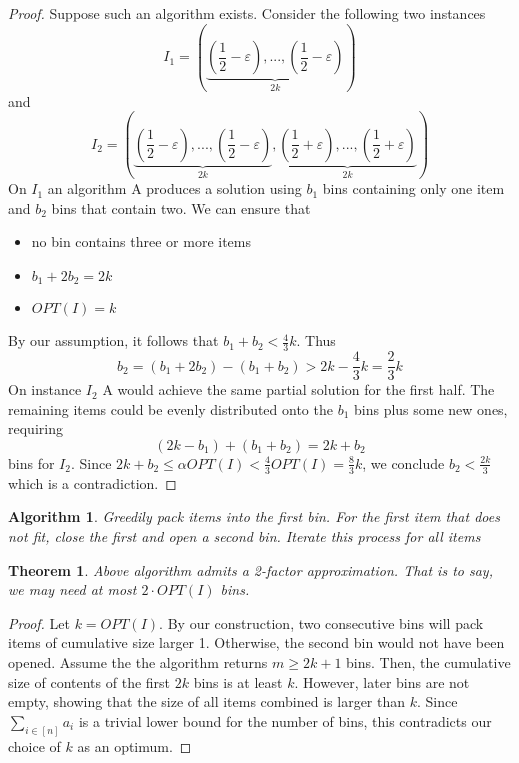 \documentclass[a4paper, 12pt]{article}
\newtheorem{theorem}{Theorem}[section]
\newtheorem{alg}{Algorithm}[section]
\begin{document}
	\begin{proof}
		Suppose such an algorithm exists. Consider the following two instances \[I_1 = \left(\underbrace{\left(\frac{1}{2} - \varepsilon\right), ..., \left(\frac{1}{2}- \varepsilon\right)}_{2k}\right)\] and \[I_2 = \left(\underbrace{\left(\frac{1}{2}- \varepsilon\right), ..., \left(\frac{1}{2}- \varepsilon\right)}_{2k}, \underbrace{\left(\frac{1}{2}+ \varepsilon\right),...,\left(\frac{1}{2}+ \varepsilon\right)}_{2k}\right)\]
		On $I_1$ an algorithm A produces a solution using $b_1$ bins containing only one item and $b_2$ bins that contain two. We can ensure that \begin{itemize}
			\item no bin contains three or more items
			\item $b_1 + 2b_2 = 2k$
			\item $OPT(I) = k$
		\end{itemize}
		By our assumption, it follows that $b_1+b_2 < \frac{4}{3}k$. Thus \[b_2 = (b_1+2b_2) - (b_1+b_2) > 2k - \frac{4}{3}k = \frac{2}{3}k\]
		On instance $I_2$ A would achieve the same partial solution for the first half. The remaining items could be evenly distributed onto the $b_1$ bins plus some new ones, requiring \[(2k-b_1) + (b_1+b_2) = 2k + b_2\]
		bins for $I_2$. Since $2k + b_2 \leq \alpha OPT(I) < \frac{4}{3} OPT(I) = \frac{8}{3}k$, we conclude $b_2 < \frac{2k}{3}$ which is a contradiction.
	\end{proof}
	\begin{alg}
		Greedily pack items into the first bin. For the first item that does not fit, close the first and open a second bin. Iterate this process for all items
	\end{alg}
	\begin{theorem}
		Above algorithm admits a 2-factor approximation. That is to say, we may need at most $2\cdot OPT(I)$ bins.
	\end{theorem}
	\begin{proof}
		Let $k = OPT(I)$. By our construction, two consecutive bins will pack items of cumulative size larger 1. Otherwise, the second bin would not have been opened. Assume the the algorithm returns $m\geq 2k+1$ bins. Then, the cumulative size of contents of the first $2k$ bins is at least $k$. However, later bins are not empty, showing that the size of all items combined is larger than $k$. Since $\sum_{i \in [n]} a_i$ is a trivial lower bound for the number of bins, this contradicts our choice of $k$ as an optimum. 
	\end{proof}
\end{document}
